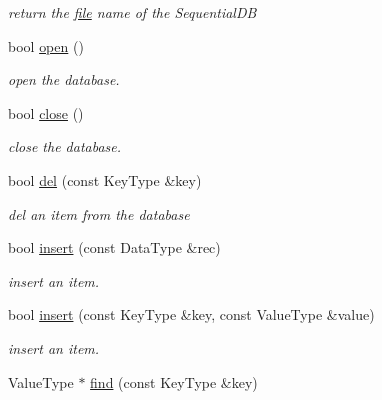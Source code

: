 \begin{CompactItemize}
\begin{CompactList}\small\item\em return the \hyperlink{classfile}{file} name of the SequentialDB \item\end{CompactList}\item 
bool \hyperlink{classBTreeFile_dbbf4c18dcccd9f9d231a5d546ff4fe6}{open} ()
\begin{CompactList}\small\item\em open the database. \item\end{CompactList}\item 
bool \hyperlink{classBTreeFile_1602f96ee8ffe4db45f563b7eaef1a17}{close} ()
\begin{CompactList}\small\item\em close the database. \item\end{CompactList}\item 
\hypertarget{classBTreeFile_e0579ea1ac46a4179aa641d61c7ac890}{
bool \hyperlink{classBTreeFile_e0579ea1ac46a4179aa641d61c7ac890}{del} (const KeyType \&key)}
\label{classBTreeFile_e0579ea1ac46a4179aa641d61c7ac890}

\begin{CompactList}\small\item\em del an item from the database \item\end{CompactList}\item 
\hypertarget{classBTreeFile_499c91e3aacf1d7037dcf16321fb8f5f}{
bool \hyperlink{classBTreeFile_499c91e3aacf1d7037dcf16321fb8f5f}{insert} (const DataType \&rec)}
\label{classBTreeFile_499c91e3aacf1d7037dcf16321fb8f5f}

\begin{CompactList}\small\item\em insert an item. \item\end{CompactList}\item 
\hypertarget{classBTreeFile_013fd27ea98d9b7a91a82adebfa81c63}{
bool \hyperlink{classBTreeFile_013fd27ea98d9b7a91a82adebfa81c63}{insert} (const KeyType \&key, const ValueType \&value)}
\label{classBTreeFile_013fd27ea98d9b7a91a82adebfa81c63}

\begin{CompactList}\small\item\em insert an item. \item\end{CompactList}\item 
\hypertarget{classBTreeFile_4ac312ccea4a625f22067e72300bb46d}{
ValueType $\ast$ \hyperlink{classBTreeFile_4ac312ccea4a625f22067e72300bb46d}{find} (const KeyType \&key)}
\label{classBTreeFile_4ac312ccea4a625f22067e72300bb46d}


\end{CompactItemize}
